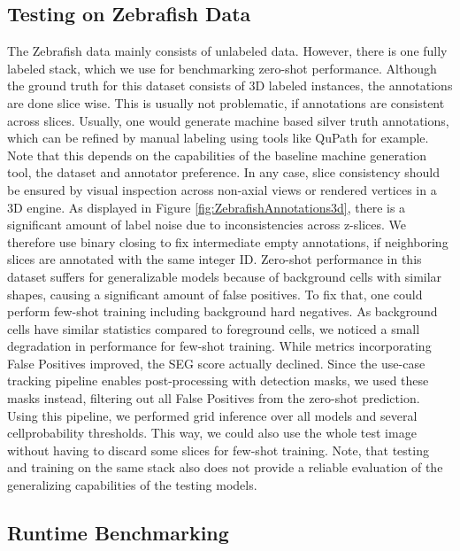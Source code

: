 \subsection{Testing on Zebrafish Data}
\label{Testing_Zebra}

The Zebrafish data mainly consists of unlabeled data. However, there is one fully labeled stack, which we use for benchmarking zero-shot performance. Although the ground truth for this dataset consists of 3D labeled instances, the annotations are done slice wise. This is usually not problematic, if annotations are consistent across slices. Usually, one would generate machine based silver truth annotations, which can be refined by manual labeling using tools like QuPath for example. Note that this depends on the capabilities of the baseline machine generation tool, the dataset and annotator preference. In any case, slice consistency should be ensured by visual inspection across non-axial views or rendered vertices in a 3D engine. As displayed in Figure \ref{fig:ZebrafishAnnotations3d}, there is a significant amount of label noise due to inconsistencies across z-slices. We therefore use binary closing to fix intermediate empty annotations, if neighboring slices are annotated with the same integer ID. 
Zero-shot performance in this dataset suffers for generalizable models because of background cells with similar shapes, causing a significant amount of false positives. To fix that, one could perform few-shot training including background hard negatives. As background cells have similar statistics compared to foreground cells, we noticed a small degradation in performance for few-shot training. While metrics incorporating False Positives improved, the SEG score actually declined. Since the use-case tracking pipeline enables post-processing with detection masks, we used these masks instead, filtering out all False Positives from the zero-shot prediction. Using this pipeline, we performed grid inference over all models and several cellprobability thresholds. This way, we could also use the whole test image without having to discard some slices for few-shot training. Note, that testing and training on the same stack also does not provide a reliable evaluation of the generalizing capabilities of the testing models.

\subsection{Runtime Benchmarking}
\label{runtime_benchmarking_section}


